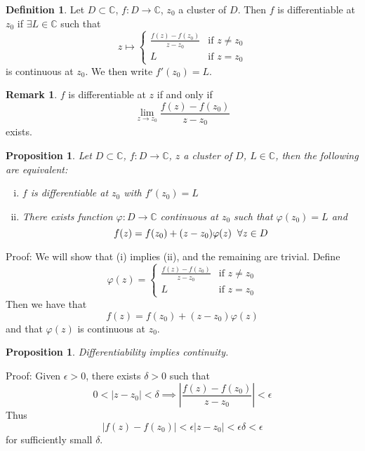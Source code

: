 \documentclass[11pt]{article}
\theoremstyle{plain}
\newtheorem{proposition}[theorem]{Proposition}
\theoremstyle{definition}
\newtheorem{definition}[theorem]{Definition}
\newtheorem{remark}{Remark}
\begin{document}
\begin{definition}
Let $D \subset \mathbb{C}$, $f: D \to \mathbb{C}$, $z_0$ a cluster of $D$. Then $f$ is differentiable at $z_0$ if $\exists L \in \mathbb{C}$ such that 
$$ z \mapsto \begin{cases}
\frac{f(z) - f(z_0)}{z - z_0} & \text{if } z \neq z_0 \\
L & \text{if } z = z_0
\end{cases} $$
is continuous at $z_0$. We then write $f'(z_0) = L$.
\end{definition}

\begin{remark}
$f$ is differentiable at $z$ if and only if 
$$ \lim_{z \to z_0} \frac{f(z) - f(z_0)}{z - z_0}$$
exists.
\end{remark}

\begin{proposition}
Let $D \subset \mathbb{C}$, $f: D \to \mathbb{C}$, $z$ a cluster of $D$, $L \in \mathbb{C}$, then the following are equivalent:
\begin{enumerate}[(i)]
\item $f$ is differentiable at $z_0$ with $f'(z_0) = L$
\item There exists function $ \varphi : D \to \mathbb{C}$ continuous at $z_0$ such that $\varphi(z_0) = L$ and 
$$ f(z) = f(z_0) + (z - z_0) \varphi(z) \hspace{2mm} \forall z \in D $$
\end{enumerate}
\end{proposition}

Proof: We will show that (i) implies (ii), and the remaining are trivial. Define 
$$ \varphi(z) = \begin{cases}
\frac{f(z) - f(z_0)}{z - z_0} & \text{if } z \neq z_0 \\
L & \text{if } z = z_0
\end{cases} $$
Then we have that 
$$ f(z) = f(z_0) + (z - z_0)\varphi(z)$$ 
and that $\varphi(z)$ is continuous at $z_0$.

\begin{proposition}
Differentiability implies continuity.
\end{proposition}

Proof: Given $\epsilon > 0$, there exists $\delta >0$ such that 
$$ 0 < |z - z_0| < \delta \implies \left|\frac{f(z) - f(z_0)}{z - z_0}\right| < \epsilon $$
Thus 
$$ |f(z) - f(z_0)| < \epsilon |z - z_0| < \epsilon \delta < \epsilon $$
for sufficiently small $\delta$.
\end{document}
